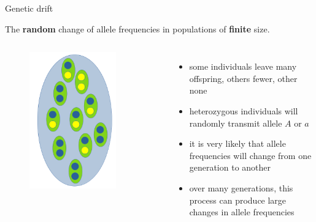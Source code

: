 \begin{frame}{Genetic drift}

	\small
	\begin{block}{}
		The \textbf{random} change of allele frequencies in populations of \textbf{finite} size.
	\end{block}

	\pause

	\begin{columns}


                \begin{figure}
                        \includegraphics[width=0.8\textwidth]{Pics/population}
                \end{figure}

                \small

                \begin{itemize}
                        \item some individuals leave many offspring, others fewer, other none
			\item heterozygous individuals will randomly transmit allele $A$ or $a$
			\item it is very likely that allele frequencies will change from one generation to another
			\item over many generations, this process can produce large changes in allele frequencies
                \end{itemize}

        \end{columns}

\end{frame}



